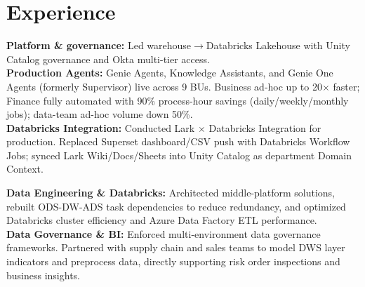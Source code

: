 \documentclass[letterpaper]{deedy-resume}
\begin{document}
\begin{minipage}[t]{0.66\textwidth} %


\section{Experience}
\vspace{1mm}


\textbf{Platform \& governance:} Led warehouse$\to$Databricks Lakehouse with Unity Catalog governance and Okta multi-tier access. \\
\textbf{Production Agents:} Genie Agents, Knowledge Assistants, and Genie One Agents (formerly Supervisor) live across 9 BUs. Business ad-hoc up to 20$\times$ faster; Finance fully automated with 90\% process-hour savings (daily/weekly/monthly jobs); data-team ad-hoc volume down 50\%. \\
\textbf{Databricks Integration:} Conducted Lark $\times$ Databricks Integration for production. Replaced Superset dashboard/CSV push with Databricks Workflow Jobs; synced Lark Wiki/Docs/Sheets into Unity Catalog as department Domain Context.

\sectionspace %


\textbf{Data Engineering \& Databricks:} Architected middle-platform solutions, rebuilt ODS-DW-ADS task dependencies to reduce redundancy, and optimized Databricks cluster efficiency and Azure Data Factory ETL performance.\\
\textbf{Data Governance \& BI:} Enforced multi-environment data governance frameworks. Partnered with supply chain and sales teams to model DWS layer indicators and preprocess data, directly supporting risk order inspections and business insights.

\sectionspace %




\end{minipage}
\end{document}
